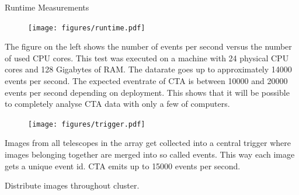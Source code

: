 \begin{multicols}{2}
    \begin{block}[]{Runtime Measurements}%
      \begin{multicols}{2}
        \begin{figure}
          \texttt{[image: figures/runtime.pdf]}\\
        \end{figure}
        \columnbreak
          The figure on the left shows the number of events per second versus the number of used CPU cores.
          This test was executed on a machine with 24 physical CPU cores and 128 Gigabytes of RAM.
          The datarate goes up to approximately \num{14000} events per second. The expected eventrate of CTA is between
          \num{10000} and \num{20000} events per second depending on deployment\cite{trigger}.
          This shows that it will be possible to completely analyse CTA data with only a few of computers.
      \end{multicols}
    \end{block}%


    \columnbreak

        \begin{center}

        \begin{streamblock}[equal height group=C, width=0.8\linewidth]{0mm}{-5mm}{}%
          \begin{multicols}{2}
            \begin{figure}
              \texttt{[image: figures/trigger.pdf]}
            \end{figure}
            \columnbreak
            Images from all telescopes in the array get collected into a central trigger where images belonging together are merged into so called events.
            This way each image gets a unique event id.
            CTA emits up to \num{15 000} events per second\cite{trigger}.
          \end{multicols}
        \end{streamblock}%

        \begin{streamblock}[colframe=white!60!black, height=2.1cm, width=0.8\linewidth]{-5mm}{0mm}{}%
          \begin{center}
            Distribute images throughout cluster.
          \end{center}
        \end{streamblock}%


\end{center}
\end{multicols}
